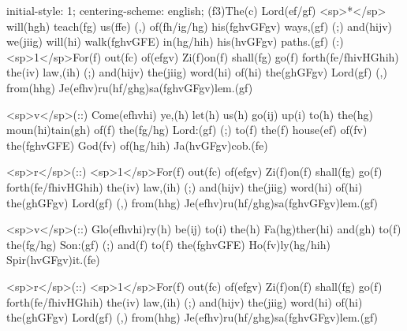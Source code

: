 initial-style: 1;
centering-scheme: english;
(f3)The(c) Lord(ef/gf) <sp>*</sp> will(hgh) teach(fg) us(ffe) (,) of(fh/ig/hg) his(fghvGFgv) ways,(gf) (;) and(hijv) we(jiig) will(hi) walk(fghvGFE) in(hg/hih) his(hvGFgv) paths.(gf) (:) <sp>1</sp>For(f) out(fc) of(efgv) Zi(f)on(f) shall(fg) go(f) forth(fe/fhivHGhih) the(iv) law,(ih) (;) and(hijv) the(jiig) word(hi) of(hi) the(ghGFgv) Lord(gf) (,) from(hhg) Je(efhv)ru(hf/ghg)sa(fghvGFgv)lem.(gf) 

<sp>v</sp>(::) Come(efhvhi) ye,(h) let(h) us(h) go(ij) up(i) to(h) the(hg) moun(hi)tain(gh) of(f) the(fg/hg) Lord:(gf) (;) to(f) the(f) house(ef) of(fv) the(fghvGFE) God(fv) of(hg/hih) Ja(hvGFgv)cob.(fe) 

<sp>r</sp>(::) <sp>1</sp>For(f) out(fc) of(efgv) Zi(f)on(f) shall(fg) go(f) forth(fe/fhivHGhih) the(iv) law,(ih) (;) and(hijv) the(jiig) word(hi) of(hi) the(ghGFgv) Lord(gf) (,) from(hhg) Je(efhv)ru(hf/ghg)sa(fghvGFgv)lem.(gf) 

<sp>v</sp>(::) Glo(efhvhi)ry(h) be(ij) to(i) the(h) Fa(hg)ther(hi) and(gh) to(f) the(fg/hg) Son:(gf) (;) and(f) to(f) the(fghvGFE) Ho(fv)ly(hg/hih) Spir(hvGFgv)it.(fe)

<sp>r</sp>(::) <sp>1</sp>For(f) out(fc) of(efgv) Zi(f)on(f) shall(fg) go(f) forth(fe/fhivHGhih) the(iv) law,(ih) (;) and(hijv) the(jiig) word(hi) of(hi) the(ghGFgv) Lord(gf) (,) from(hhg) Je(efhv)ru(hf/ghg)sa(fghvGFgv)lem.(gf) 